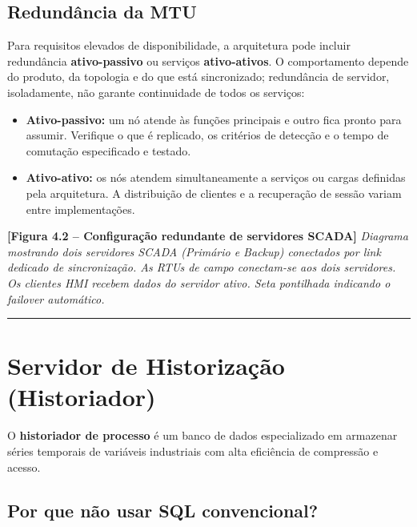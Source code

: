 \subsection{Redundância da MTU}\label{redunduxe2ncia-da-mtu}

Para requisitos elevados de disponibilidade, a arquitetura pode incluir redundância \textbf{ativo-passivo}
ou serviços \textbf{ativo-ativos}. O comportamento depende do produto, da topologia e do que está
sincronizado; redundância de servidor, isoladamente, não garante continuidade de todos os serviços:

\begin{itemize}
\tightlist
\item
  \textbf{Ativo-passivo:} um nó atende às funções principais e outro fica pronto para assumir. Verifique o que é replicado, os critérios de detecção e o tempo de comutação especificado e testado.
\item
  \textbf{Ativo-ativo:} os nós atendem simultaneamente a serviços ou cargas definidas pela arquitetura. A distribuição de clientes e a recuperação de sessão variam entre implementações.
\end{itemize}

\begin{caixafigura}

\textbf{{[}Figura 4.2 -- Configuração redundante de servidores SCADA{]}}
\emph{Diagrama mostrando dois servidores SCADA (Primário e Backup) conectados por link dedicado de sincronização. As RTUs de campo conectam-se aos dois servidores. Os clientes HMI recebem dados do servidor ativo. Seta pontilhada indicando o failover automático.}

\end{caixafigura}

\begin{center}\rule{0.5\linewidth}{0.5pt}\end{center}

\section{Servidor de Historização (Historiador)}\label{servidor-de-historizauxe7uxe3o-historiador}

O \textbf{historiador de processo} é um banco de dados especializado em armazenar séries temporais de variáveis industriais com alta eficiência de compressão e acesso.

\subsection{Por que não usar SQL convencional?}\label{por-que-nuxe3o-usar-sql-convencional}

